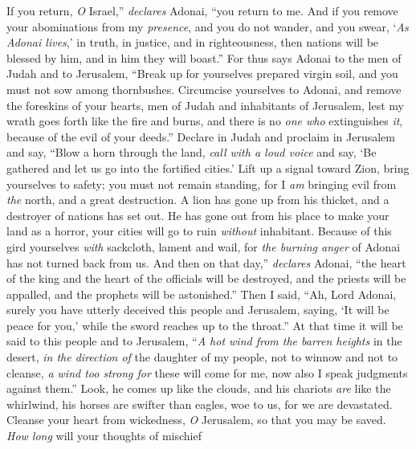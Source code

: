 \begin{biblechapter} %
\verse If you return, \textit{O} Israel,” \textit{declares} Adonai, 
“you return to me. 
And if you remove your abominations from my \textit{presence}, 
and you do not wander,
\verse and you swear, ‘\textit{As Adonai lives},’ 
in truth, in justice, and in righteousness, 
then nations will be blessed by him, 
and in him they will boast.”
\verse For thus says Adonai 
to the men of Judah and to Jerusalem, 
“Break up for yourselves prepared virgin soil, 
and you must not sow among thornbushes.
\verse Circumcise yourselves to Adonai, 
and remove the foreskins of your hearts, 
men of Judah and inhabitants of Jerusalem, 
lest my wrath goes forth like the fire and burns, 
and there is no \textit{one who} extinguishes \textit{it}, 
because of the evil of your deeds.”
 Declare in Judah and proclaim in Jerusalem and say, 
“Blow a horn through the land, 
\textit{call with a loud voice} and say, 
‘Be gathered and let us go into the fortified cities.’
\verse Lift up a signal toward Zion, 
bring yourselves to safety; you must not remain standing, 
for I \textit{am} bringing evil from \textit{the} north, 
and a great destruction.
\verse A lion has gone up from his thicket, 
and a destroyer of nations has set out. 
He has gone out from his place to make your land as a horror, 
your cities will go to ruin \textit{without} inhabitant.
\verse Because of this gird yourselves \textit{with} sackcloth, lament and wail, 
for \textit{the burning anger} of Adonai has not turned back from us.
\verse And then on that day,” \textit{declares} Adonai, 
“the heart of the king and the heart of the officials will be destroyed, 
and the priests will be appalled, 
and the prophets will be astonished.”
\verse Then I said, “Ah, Lord Adonai, surely you have utterly deceived this people and Jerusalem, saying, ‘It will be peace for you,’ while the sword reaches up to the throat.”
\verse At that time it will be said to this people and to Jerusalem, 
“\textit{A hot wind from the barren heights} in the desert, 
\textit{in the direction of} the daughter of my people, 
not to winnow and not to cleanse,
\verse \textit{a wind too strong for} these will come for me, 
now also I speak judgments against them.”
\verse Look, he comes up like the clouds, 
and his chariots \textit{are} like the whirlwind, 
his horses are swifter than eagles, 
woe to us, for we are devastated.
\verse Cleanse your heart from wickedness, \textit{O} Jerusalem, 
so that you may be saved. 
\textit{How long} will your thoughts of mischief 

\end{biblechapter}
